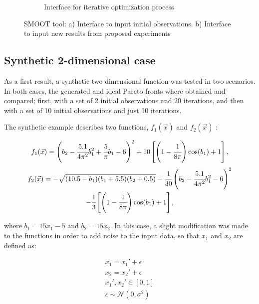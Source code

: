 \documentclass{article}
\begin{document}
\begin{figure}
\begin{subfigure}{0.45\textwidth}
        \caption{Interface for iterative optimization process}
        \label{tool_2}
    \end{subfigure}
\caption{SMOOT tool: a) Interface to input initial observations. b) Interface to input new results from proposed experiments}
\label{tool}
\end{figure}

\subsection{Synthetic 2-dimensional case}

As a first result, a synthetic two-dimensional function was tested in two scenarios. In both cases, the generated and ideal Pareto fronts where obtained and compared; first, with a set of 2 initial observations and 20 iterations, and then with a set of 10 initial observations and just 10 iterations.

The synthetic example describes two functions, $f_1(\vec{x})$ and $f_2(\vec{x})$ \cite{parr2013improvement}:

\begin{equation}\label{f1}
    f_1(\vec{x}) = \left( b_2 - \cfrac{5.1}{4\pi^2}b_1^2 + \cfrac{5}{\pi}b_1 - 6 \right)^2 + 10\left[ \left( 1 - \cfrac{1}{8\pi} \right)\cos(b_1) + 1 \right],
\end{equation}
\begin{multline}\label{f2}
    f_2(\vec{x}) = - \sqrt{(10.5-b_1)(b_1+5.5)(b_2+0.5)} - \cfrac{1}{30}\left( b_2 - \cfrac{5.1}{4\pi^2}b_1^2 - 6 \right)^2\\ - \cfrac{1}{3}\left[ \left( 1 - \cfrac{1}{8\pi} \right)\cos(b_1) + 1 \right],
\end{multline}

where $b_1 = 15x_1 - 5$ and $b_2 = 15x_2$. In this case, a slight modification was made to the functions in order to add noise to the input data, so that $x_1$ and $x_2$ are defined as:

\begin{align*}
    x_1 = x_1' + \epsilon\\
    x_2 = x_2' + \epsilon\\
    x_1', x_2' \in \left[0,1\right]\\
    \epsilon \sim \mathcal{N}(0,\sigma^2)
\end{align*}
\end{document}
